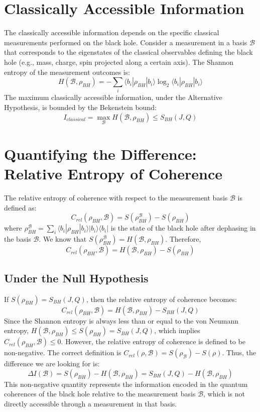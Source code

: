 	\section{Classically Accessible Information}
	
	The classically accessible information depends on the specific classical measurements performed on the black hole. Consider a measurement in a basis $\mathcal{B}$ that corresponds to the eigenstates of the classical observables defining the black hole (e.g., mass, charge, spin projected along a certain axis). The Shannon entropy of the measurement outcomes is:
	$$H(\mathcal{B}, \rho_{BH}) = -\sum_i \langle b_i|\rho_{BH}|b_i\rangle \log_2 \langle b_i|\rho_{BH}|b_i\rangle$$
	The maximum classically accessible information, under the Alternative Hypothesis, is bounded by the Bekenstein bound:
	$$I_{classical} = \max_{\mathcal{B}} H(\mathcal{B}, \rho_{BH}) \le S_{BH}(J, Q)$$
	
	\section{Quantifying the Difference: Relative Entropy of Coherence}
	
	The relative entropy of coherence with respect to the measurement basis $\mathcal{B}$ is defined as:
	$$C_{rel}(\rho_{BH}, \mathcal{B}) = S(\rho_{BH}^{\mathcal{B}}) - S(\rho_{BH})$$
	where $\rho_{BH}^{\mathcal{B}} = \sum_i \langle b_i|\rho_{BH}|b_i\rangle |b_i\rangle\langle b_i|$ is the state of the black hole after dephasing in the basis $\mathcal{B}$. We know that $S(\rho_{BH}^{\mathcal{B}}) = H(\mathcal{B}, \rho_{BH})$. Therefore,
	$$C_{rel}(\rho_{BH}, \mathcal{B}) = H(\mathcal{B}, \rho_{BH}) - S(\rho_{BH})$$
	
	\subsection{Under the Null Hypothesis}
	If $S(\rho_{BH}) = S_{BH}(J, Q)$, then the relative entropy of coherence becomes:
	$$C_{rel}(\rho_{BH}, \mathcal{B}) = H(\mathcal{B}, \rho_{BH}) - S_{BH}(J, Q)$$
	Since the Shannon entropy is always less than or equal to the von Neumann entropy, $H(\mathcal{B}, \rho_{BH}) \le S(\rho_{BH}) = S_{BH}(J, Q)$, which implies $C_{rel}(\rho_{BH}, \mathcal{B}) \le 0$. However, the relative entropy of coherence is defined to be non-negative. The correct definition is $C_{rel}(\rho, \mathcal{B}) = S(\rho_{\mathcal{B}}) - S(\rho)$. Thus, the difference we are looking for is:
	$$\Delta I(\mathcal{B}) = S(\rho_{BH}) - H(\mathcal{B}, \rho_{BH}) = S_{BH}(J, Q) - H(\mathcal{B}, \rho_{BH})$$
	This non-negative quantity represents the information encoded in the quantum coherences of the black hole relative to the measurement basis $\mathcal{B}$, which is not directly accessible through a measurement in that basis.
	
